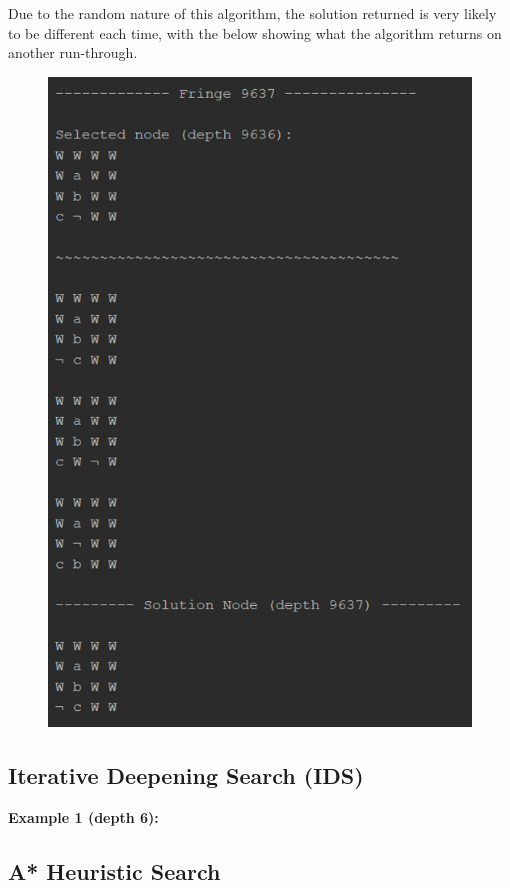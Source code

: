 \documentclass{article}
\begin{document}
	\newpage
	Due to the random nature of this algorithm, the solution returned is very likely to be different each time, with the below showing what the algorithm returns on another run-through.
	
	\begin{figure}[h]	
		\centering
		\includegraphics[height=0.6\textheight,keepaspectratio]{DFS-2-5.png}
	\end{figure}
	
	\newpage
	\subsection{Iterative Deepening Search (IDS)}
	\textbf{Example 1 (depth 6):}
	
	\subsection{A* Heuristic Search}
	
\end{document}
